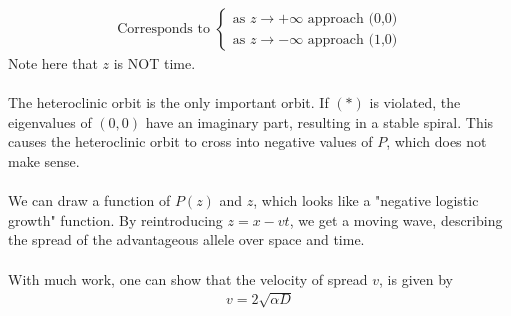 \documentclass[12pt, letterpaper]{article}
\begin{document}
\begin{align*}
    \text{Corresponds to } \begin{cases}
        \text{as } z \rightarrow +\infty \text{ approach (0,0)} \\
        \text{as } z \rightarrow -\infty \text{ approach (1,0)}
    \end{cases}
\end{align*}
Note here that $z$ is NOT time. \\ \\
The heteroclinic orbit is the only important orbit. If $(\ast)$ is violated, the 
eigenvalues of $(0,0)$ have an imaginary part, resulting in a stable spiral. This 
causes the heteroclinic orbit to cross into negative values of $P$, which does not 
make sense. \\ \\
We can draw a function of $P(z)$ and $z$, which looks like a "negative logistic growth"
function. By reintroducing $z = x - vt$, we get a moving wave, describing the 
spread of the advantageous allele over space and time. \\ \\
With much work, one can show that the velocity of spread $v$, is given by
\begin{align*}
    v = 2\sqrt{\alpha D}
\end{align*}
\end{document}
